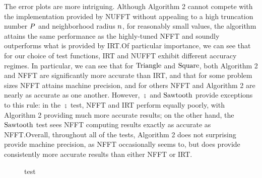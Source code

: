 The error plots are more intriguing. Although Algorithm 2 cannot
compete with the implementation provided by NUFFT without appealing to
a high truncation number $P$ and neighborhood radius
$n$, for reasonably small values, the algorithm
attains the same performance as the highly-tuned NFFT and soundly
outperforms what is provided by IRT.\@ Of particular importance, we
can see that for our choice of test functions, IRT and NUFFT exhibit
different accuracy regimes. In particular, we can see that for $\operatorname{Triangle}$
and $\operatorname{Square}$, both Algorithm 2 and NFFT are significantly more accurate
than IRT, and that for some problem sizes NFFT attains machine
precision, and for others NFFT and Algorithm 2 are nearly as accurate
as one another. However, $\semi$ and $\operatorname{Sawtooth}$ provide exceptions to this
rule: in the $\semi$ test, NFFT and IRT perform equally poorly, with
Algorithm 2 providing much more accurate results; on the other hand,
the $\operatorname{Sawtooth}$ test sees NFFT computing results exactly as accurate as
NFFT.\@ Overall, throughout all of the tests, Algorithm 2 does not
surprising provide machine precision, as NFFT occasionally seems to,
but does provide consistently more accurate results than either NFFT
or IRT.\@

\begin{figure}[h]
  \centering
  
  \caption{test}\label{fig:raddiff}
\end{figure}

